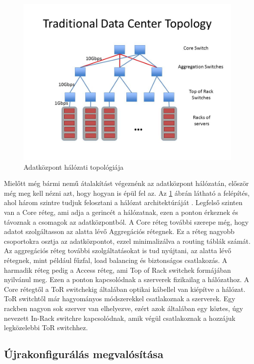 \documentclass[12pt]{report}
\begin{document}
\begin{figure}[h]
	\centering
	\includegraphics[width=0.7\linewidth]{pictures/Traditional+Data+Center+Topology.jpg}
	\caption{Adatközpont hálózati topológiája}
	\label{datacenter_topology}
\end{figure}

Mielőtt még bármi nemű átalakítást végeznénk az adatközpont hálózatán, először még meg kell nézni azt, hogy hogyan is épül fel az.
Az \ref{datacenter_topology} ábrán látható a felépítés, ahol három szintre tudjuk felosztani a hálózat architektúráját \cite{noauthor_you_nodate} \cite{noauthor_cisco_nodate}.
Legfelső szinten van a Core réteg, ami adja a gerincét a hálózatnak, ezen a ponton érkeznek és távoznak a csomagok az adatközpontból.
A Core réteg további szerepe még, hogy adatot szolgáltasson az alatta lévő Aggregációs rétegnek.
Ez a réteg nagyobb csoportokra osztja az adatközpontot, ezzel minimalizálva a routing táblák számát.
Az aggregációs réteg további szolgáltatásokat is tud nyújtani, az alatta lévő rétegnek, mint például fűzfal, load balancing és biztonságos csatlakozás.
A harmadik réteg pedig a Access réteg, ami Top of Rack switchek formájában nyilvánul meg.
Ezen a ponton kapcsolódnak a szerverek fizikailag a hálózathoz.
A Core rétegtől a ToR switchekig általában optikai kábellel van kiépítve a hálózat. 
ToR switchtől már hagyományos módszerekkel csatlakoznak a szerverek.
Egy rackben nagyon sok szerver van elhelyezve, ezért azok általában egy köztes, úgy nevezett In-Rack switchre kapcsolódnak, amik végül csatlakoznak a hozzájuk legközelebbi ToR switchhez.



\subsection{Újrakonfigurálás megvalósítása}
\end{document}
